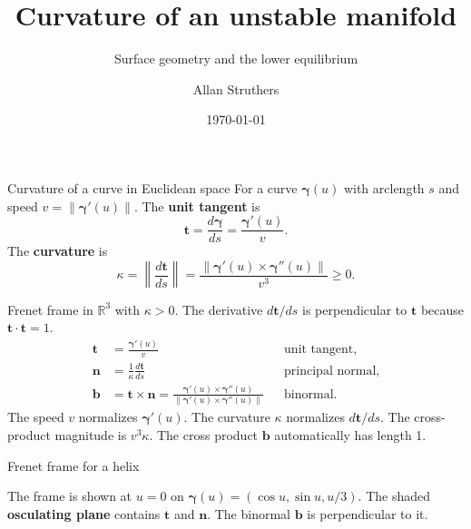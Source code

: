 \documentclass[11pt,aspectratio=169]{beamer}
\author{Allan Struthers}
\institute{Math Sciences}
\title{Curvature of an unstable manifold}
\subtitle{Surface geometry and the lower \Rossler{} equilibrium}
\date{\today}
\newcommand{\vect}[1]{\bm{#1}}
\begin{document}
\begin{frame}
  \titlepage
\end{frame}

\begin{frame}{Curvature of a curve in Euclidean space}
For a curve \(\vect{\gamma}(u)\) with arclength \(s\) and
speed \(v=\|\vect{\gamma}'(u)\|\). The \textbf{unit tangent} is
\[
  \vect{t}=\frac{d\vect{\gamma}}{ds}=\frac{\vect{\gamma}'(u)}{v}.
\]
The \textbf{curvature} is
\[
  \kappa=\left\|\frac{d\vect{t}}{ds}\right\|
  =\frac{\|\vect{\gamma}'(u)\times\vect{\gamma}''(u)\|}{v^3} \geq 0.
\]
\end{frame}

\begin{frame}{Frenet frame in $\mathbb{R}^3$ with \(\kappa>0\).}
The derivative \(d\vect{t}/ds\) is perpendicular to \(\vect{t}\)
because \(\vect{t}\cdot\vect{t}=1\).
\[
 \begin{aligned}
 \vect{t}&=\frac{\vect{\gamma}'(u)}{v}
    &&\text{unit tangent},\\
 \vect{n}&=\frac{1}{\kappa}\frac{d\vect{t}}{ds}
    &&\text{principal normal},\\
 \vect{b}&=\vect{t}\times\vect{n}
    =\frac{\vect{\gamma}'(u)\times\vect{\gamma}''(u)}
          {\|\vect{\gamma}'(u)\times\vect{\gamma}''(u)\|}
    &&\text{binormal}.
 \end{aligned}
\]
The speed \(v\) normalizes \(\vect{\gamma}'(u)\).
The curvature \(\kappa\) normalizes \(d\vect{t}/ds\).
The cross-product magnitude is \(v^3\kappa\).
The cross product \(\vect{b}\) automatically has length 1.
\end{frame}

\begin{frame}{Frenet frame for a helix}
\centering
{}

The frame is shown at \(u=0\) on
\(\vect{\gamma}(u)=(\cos u,\sin u,u/3)\).
The shaded \textbf{osculating plane} contains \(\vect{t}\) and
\(\vect{n}\). The binormal \(\vect{b}\) is perpendicular to it.
\end{frame}
\end{document}
